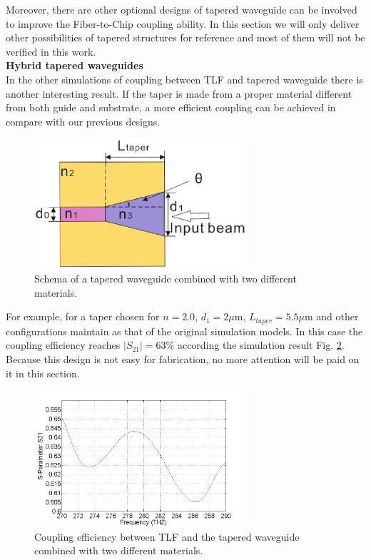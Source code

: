 Moreover, there are other optional designs of tapered waveguide can be involved to improve the Fiber-to-Chip coupling ability. In this section we will only deliver other possibilities of tapered structures for reference and most of them will not be verified in this work.   \\

\textbf{Hybrid tapered waveguides}\\ 
 
In the other simulations of coupling between TLF and tapered waveguide there is another interesting result. If the taper is made from a proper material different from both guide and substrate, a more efficient coupling can be achieved in compare with our previous designs.\\
 
\begin{figure}[!ht]
\centering
\includegraphics[width=0.7\textwidth]{bilder/tapered_waveguide_others}
\caption{Schema of a tapered waveguide combined with two different materials.}
\label{fig:tapered_waveguide_others}
\end{figure}
For example, for a taper chosen for $n=2.0$, $d_{1}=2\mu$m, $L_{taper}=5.5\mu$m and other configurations maintain as that of the original simulation models. In this case the coupling efficiency reaches $|S_{21}|=63\%$ according the simulation result Fig. \ref{fig:tapered_waveguide_others_coupling}.  Because this design is not easy for fabrication, no more attention will be paid on it in this section.\\
   
\begin{figure}[!ht]
\centering
\includegraphics[width=0.7\textwidth]{bilder/s21_tapered_waveguide_others}
\caption{Coupling efficiency between TLF and the tapered waveguide combined with two different materials.}
\label{fig:tapered_waveguide_others_coupling}
\end{figure}

